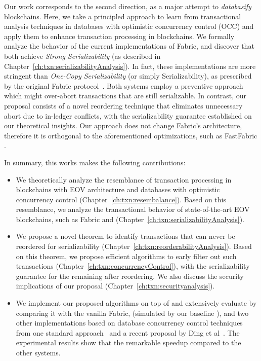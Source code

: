 Our work corresponds to the second direction, as a major attempt to
\textit{databasify} blockchains.
%
Here, we take a principled approach to learn from transactional analysis
techniques in databases with optimistic concurrency control (OCC) and apply them
to enhance transaction processing in blockchains.
%
We formally analyze the behavior of the current implementations of Fabric, and discover that both
achieve \textit{Strong Serializability} \cite{bailis2013highly} (as described in Chapter~\ref{ch:txn:serializabilityAnalysis}).
%
In fact, these implementations are more stringent than
\textit{One-Copy Serializability} (or simply Serializability), as prescribed by the original Fabric protocol~\cite{androulaki2018hyperledger}.
%
Both systems employ a preventive approach which might over-abort transactions that are still serializable.
%
In contrast, our proposal consists of a novel reordering technique that
eliminates unnecessary abort due to in-ledger conflicts, with the serializability guarantee established on our theoretical insights. 
%
Our approach does not change Fabric's architecture, therefore it is orthogonal to the aforementioned optimizations, such as FastFabric \cite{gorenflo2019fastfabric}. 

In summary, this works makes the following contributions:
\begin{itemize}
\item We theoretically analyze the resemblance of transaction processing in
  blockchains with EOV architecture and databases with optimistic concurrency
  control (Chapter~\ref{ch:txn:resembalance}).
  Based on this resemblance, we analyze the transactional behavior of
  state-of-the-art EOV blockchains, such as Fabric and {\fabricPlusplus}
  (Chapter~\ref{ch:txn:serializabilityAnalysis}).
  
\item We propose a novel theorem to identify transactions that can never be
  reordered for serializability 
  (Chapter~\ref{ch:txn:reorderabilityAnalysis}).
  Based on this theorem, we propose efficient algorithms to early filter out
  such transactions (Chapter~\ref{ch:txn:concurrencyControl}), 
  with the serializability guarantee for the remaining after reordering.
  We also discuss the security implications of our proposal (Chapter~\ref{ch:txn:securityanalysis}).
  

\item We implement our proposed algorithms on top of {\fs} and extensively evaluate {\fs} by comparing it with the vanilla
  Fabric, {\fabricPlusplus}(simulated by our baseline {\fsP}), and two other implementations based on database concurrency control techniques from one standard approach~\cite{CahillRF08} and a recent proposal by Ding et al~\cite{ding2018improving}.
  The experimental results show that the remarkable speedup compared to the other systems.
\end{itemize}

